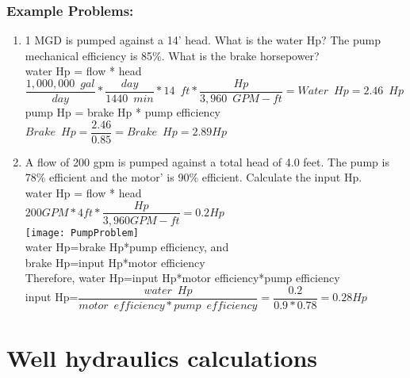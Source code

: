 \subsubsection{Example Problems:}
\begin{enumerate}[1.]


\item 1 MGD is pumped against a 14’ head.  What is the water Hp?  The pump mechanical efficiency is 85\%.  What is the brake horsepower?\\
\vspace{0.4cm}
water Hp = flow * head\\
\vspace{0.4cm}
$\dfrac{1,000,000 \enspace gal}{day}*\dfrac{day}{1440 \enspace min}*14 \enspace ft*\dfrac{Hp}{3,960 \enspace GPM-ft}=\boxed{Water \enspace Hp = 2.46 \enspace Hp}$\\
\vspace{0.4cm}
pump Hp = brake Hp * pump efficiency\\
\vspace{0.4cm}
$Brake \enspace Hp = \dfrac{2.46}{0.85}=\boxed{Brake \enspace Hp=2.89Hp}$\\
\vspace{0.4cm}

\item A flow of 200 gpm  is pumped against a total head of 4.0 feet. The pump is 78\% efficient and the motor' is 90\% efficient. Calculate the input Hp.\\
\vspace{0.4cm}
water Hp = flow * head\\
\vspace{0.2cm}
$200GPM*4ft*\dfrac{Hp}{3,960 GPM-ft}=0.2Hp$\\
\vspace{0.4cm}\texttt{[image: PumpProblem]}\\
water Hp=brake Hp*pump efficiency, and\\
brake Hp=input Hp*motor efficiency\\
Therefore, water Hp=input Hp*motor efficiency*pump efficiency\\
\vspace{0.4cm}
input Hp=$\dfrac{water \enspace Hp}{motor \enspace efficiency*pump \enspace efficiency}=\dfrac{0.2}{0.9*0.78}=\boxed{0.28Hp}$
\vspace{0.2cm}
\end{enumerate}



\section{Well hydraulics calculations} 

